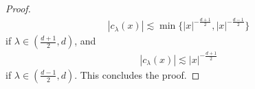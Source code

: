 \documentclass[a4paper, reqno, 11pt]{amsart}
\theoremstyle{definition}
\begin{document}
\begin{proof}
\begin{align*}
|c_{\lambda}(x)| \lesssim \min\{|x|^{-\frac{d+1}{2}} , |x|^{-\frac{d-1}{2}}\}
\end{align*}
if $\lambda \in (\frac{d+1}{2},d)$, and 
\begin{align*}
|c_{\lambda}(x)| \lesssim |x|^{-\frac{d+1}{2}}
\end{align*}
if $\lambda \in (\frac{d-1}{2},d)$. This concludes the proof.
\end{proof}
\end{document}
